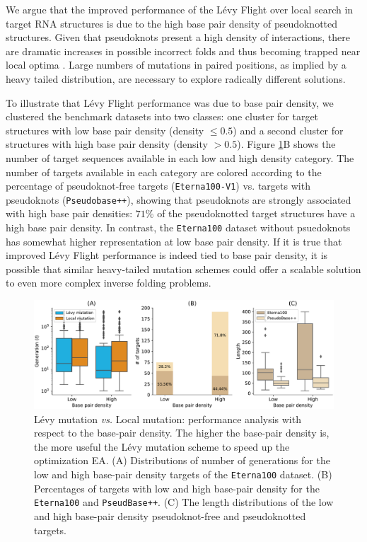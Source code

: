 We argue that the improved performance of the Lévy Flight over local search in target RNA structures is due to the high base pair density of pseudoknotted structures. Given that pseudoknots present a high density of interactions, there are dramatic increases in possible incorrect folds and thus becoming trapped near local optima \cite{hajdin2013accurate}. Large numbers of mutations in paired positions, as implied by a heavy tailed distribution, are necessary to explore radically different solutions. 

To illustrate that Lévy Flight performance was due to base pair density, we clustered the benchmark datasets into two classes: one cluster for target structures with low base pair density (density $\leq 0.5$) and a second cluster for structures with high base pair density (density $> 0.5$). Figure \ref{Fig:diversity2}B shows the number of target sequences available in each low and high density category. The number of targets available in each category are colored according to the percentage of pseudoknot-free targets (\texttt{Eterna100-V1}) vs. targets with pseudoknots (\texttt{Pseudobase++}), showing that pseudoknots are strongly associated with high base pair densities: $71\%$ of the pseudoknotted target structures have a high base pair density.  In contrast, the \texttt{Eterna100} dataset without psuedoknots has somewhat higher representation at low base pair density. If it is true that improved Lévy Flight performance is indeed tied to base pair density, it is possible that similar heavy-tailed mutation schemes could offer a scalable solution to even more complex inverse folding problems. 
\begin{figure}[t!]
	\centering
	\includegraphics[width=1.05\linewidth]{../res/images/arnaque/fig10.pdf}
	\small
	\caption{Lévy mutation \emph{vs.} Local mutation: performance analysis with respect to the base-pair density. The higher the base-pair density is, the more useful the Lévy mutation scheme to speed up the optimization EA. (A) Distributions of number of generations for the low and high base-pair density targets of the \texttt{Eterna100} dataset. (B) Percentages of targets with low and high base-pair density for the \texttt{Eterna100} and \texttt{PseudBase++}. (C) The length distributions of the low and high base-pair density pseudoknot-free and pseudoknotted targets.} \label{Fig:diversity2}
\end{figure}

